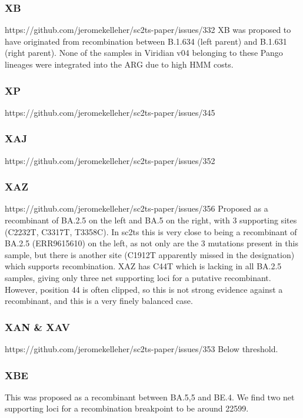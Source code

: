 \documentclass[12pt,letterpaper]{article}
\begin{document}
\subsubsection*{XB}
https://github.com/jeromekelleher/sc2ts-paper/issues/332
XB was proposed to have originated from recombination between B.1.634 (left parent) and B.1.631 (right parent). 
None of the samples in Viridian v04 belonging to these Pango lineages were integrated into the ARG due to high HMM costs.

\subsubsection*{XP}
https://github.com/jeromekelleher/sc2ts-paper/issues/345

\subsubsection*{XAJ}
https://github.com/jeromekelleher/sc2ts-paper/issues/352

\subsubsection*{XAZ}
https://github.com/jeromekelleher/sc2ts-paper/issues/356
Proposed as a recombinant of BA.2.5 on the left and BA.5 on the right, with 3 supporting sites (C2232T, C3317T, T3358C). 
In sc2ts this is very close to being a recombinant of BA.2.5 (ERR9615610) on the left, 
as not only are the 3 mutations present in this sample, 
but there is another site (C1912T apparently missed in the designation) which supports recombination. 
XAZ has C44T which is lacking in all BA.2.5 samples, 
giving only three net supporting loci for a putative recombinant. 
However, position 44 is often clipped, so this is not strong evidence against a recombinant, and 
this is a very finely balanced case.

\subsubsection*{XAN & XAV}
https://github.com/jeromekelleher/sc2ts-paper/issues/353
Below threshold.

\subsubsection*{XBE}
This was proposed as a recombinant between BA.5,5 and BE.4. 
We find two net supporting loci for a recombination breakpoint to be around 22599.
\end{document}
